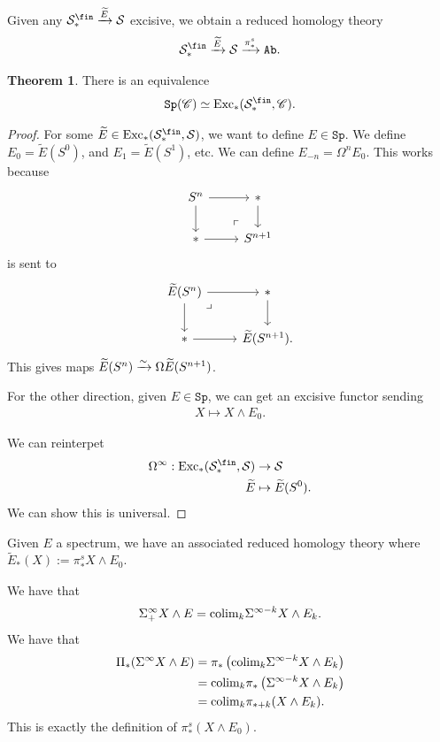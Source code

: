 \documentclass[12pt]{amsart}
\let\til\widetilde
\theoremstyle{definition}
\newtheorem{theorem}{Theorem}[section]
\let\smashprod\wedge
\providecommand{\Sp}{\texttt{Sp}}
\providecommand{\Sp}{\text{Sp}}
\providecommand{\Exc}{\text{Exc}}
\begin{document}
Given any $\mathcal{S}_\ast^\fin \xto{\til{E}} \mathcal{S}$ excisive, we obtain a reduced homology theory
\begin{align*}
    \mathcal{S}_\ast^\fin \xto{\til{E}} \mathcal{S} \xto{\pi_\ast^s} \Ab.
\end{align*}

\begin{theorem} There is an equivalence
\begin{align*}
    \Sp(\mathscr{C}) \simeq \Exc_\ast(\mathcal{S}_\ast^\fin, \mathscr{C}).
\end{align*}
\end{theorem}
\begin{proof} For some $\til{E} \in \Exc_\ast(\mathcal{S}_\ast^\fin, \mathcal{S})$, we want to define $E \in \Sp$. We define $E_0 = \til{E}(S^0)$, and $E_1 = \til{E}(S^1)$, etc. We can define $E_{-n} = \Omega^n E_0$. This works because
\[ \begin{tikzcd}
    S^n\rar\dar & \ast\dar\\
    \ast\rar & S^{n+1}\po
\end{tikzcd} \]
is sent to
\[ \begin{tikzcd}
    \til{E}(S^n)\rar\dar\pb & \ast\dar\\
    \ast\rar & \til{E}(S^{n+1}).
\end{tikzcd} \]
This gives maps $\til{E}(S^n) \xto{\sim} \Omega \til{E}(S^{n+1})$.

For the other direction, given $E \in \Sp$, we can get an excisive functor sending
\begin{align*}
    X \mapsto X \smashprod E_0.
\end{align*}

We can reinterpet
\begin{align*}
    \Omega^\infty : \Exc_\ast(\mathcal{S}_\ast^\fin, \mathcal{S}) &\to \mathcal{S} \\
    \til{E} &\mapsto \til{E}(S^0).
\end{align*}
We can show this is universal.
\end{proof}

Given $E$ a spectrum, we have an associated reduced homology theory where $\til{E}_\ast(X) := \pi_\ast^s X \smashprod E_0$.

We have that
\begin{align*}
    \Sigma^\infty_+ X \smashprod E = \colim_k \Sigma^{\infty-k} X \smashprod E_k.
\end{align*}
We have that
\begin{align*}
    \Pi_\ast (\Sigma^\infty X \smashprod E) &= \pi_\ast \left( \colim_k \Sigma^{\infty-k} X \smashprod E_k \right) \\
    &= \colim_k \pi_\ast \left( \Sigma^{\infty-k} X \smashprod E_k \right) \\
    &= \colim_k \pi_{\ast+k}(X \smashprod E_k).
\end{align*}
This is exactly the definition of $\pi_\ast^s(X\smashprod E_0)$.
\end{document}
